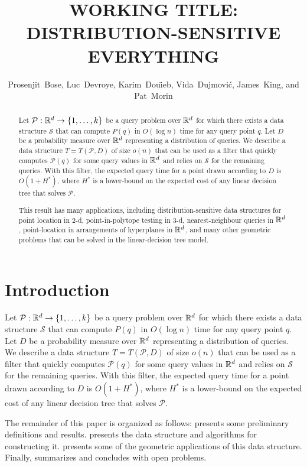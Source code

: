 \documentclass{patmorin}
\title{\MakeUppercase{Working Title: Distribution-Sensitive Everything}}
\author{Prosenjit~Bose, 
        Luc~Devroye,
	Karim~Dou\"{\i}eb, 
	Vida~Dujmovi\'c, 
	James~King, and 
	Pat~Morin}
\begin{document}
\maketitle

\begin{abstract}
Let $\mathcal{P}:\mathbb{R}^d\rightarrow\{1,\ldots,k\}$ be a query problem over
$\mathbb{R}^d$ for which there exists a data structure $\mathcal{S}$ that can
compute $P(q)$ in $O(\log n)$ time for any query point $q$.  Let $D$ be
a probability measure over $\mathbb{R}^d$ representing a distribution of queries.
We describe a data structure $T=T(\mathcal{P},D)$ of size $o(n)$ that can
be used as a filter that quickly computes $\mathcal{P}(q)$ for some query
values in $\mathbb{R}^d$ and relies on $\mathcal{S}$ for the remaining queries.
With this filter, the expected query time for a point drawn according
to $D$ is $O(1+ H^*)$, where $H^*$ is a lower-bound on the expected cost
of any linear decision tree that solves $\mathcal{P}$.

This result has many applications, including distribution-sensitive data
structures for point location in 2-d, point-in-polytope testing in 3-d,
nearest-neighbour queries in $\mathbb{R}^d$, point-location in arrangements of
hyperplanes in $\mathbb{R}^d$, and many other geometric problems that can be
solved in the linear-decision tree model.
\end{abstract}

\section{Introduction}

Let $\mathcal{P}:\mathbb{R}^d\rightarrow\{1,\ldots,k\}$ be a query problem over
$\mathbb{R}^d$ for which there exists a data structure $\mathcal{S}$ that can
compute $P(q)$ in $O(\log n)$ time for any query point $q$.  Let $D$ be
a probability measure over $\mathbb{R}^d$ representing a distribution of queries.
We describe a data structure $T=T(\mathcal{P},D)$ of size $o(n)$ that can
be used as a filter that quickly computes $\mathcal{P}(q)$ for some query
values in $\mathbb{R}^d$ and relies on $\mathcal{S}$ for the remaining queries.
With this filter, the expected query time for a point drawn according
to $D$ is $O(1+ H^*)$, where $H^*$ is a lower-bound on the expected cost
of any linear decision tree that solves $\mathcal{P}$.


The remainder of this paper is organized as follows: 
presents some preliminary definitions and results. 
presents the data structure and algorithms for constructing it.
 presents some of the geometric applications of this
data structure.  Finally,  summarizes and concludes
with open problems.
\end{document}
